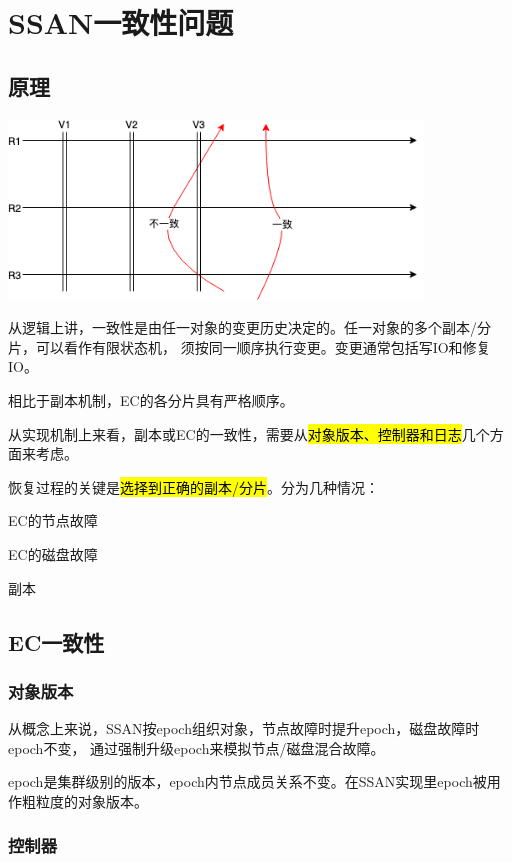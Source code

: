 \chapter{SSAN一致性问题}

\section{原理}

\includegraphics[width=11cm]{../imgs/consistency-splice.png}

从逻辑上讲，一致性是由任一对象的变更历史决定的。任一对象的多个副本/分片，可以看作有限状态机，
须按同一顺序执行变更。变更通常包括写IO和修复IO。

相比于副本机制，EC的各分片具有严格顺序。

从实现机制上来看，副本或EC的一致性，需要从\hl{对象版本、控制器和日志}几个方面来考虑。

恢复过程的关键是\hl{选择到正确的副本/分片}。分为几种情况：
\begin{enumbox}
\item EC的节点故障
\item EC的磁盘故障
\item 副本
\end{enumbox}

\section{EC一致性}

\subsection{对象版本}

从概念上来说，SSAN按epoch组织对象，节点故障时提升epoch，磁盘故障时epoch不变，
通过强制升级epoch来模拟节点/磁盘混合故障。

epoch是集群级别的版本，epoch内节点成员关系不变。在SSAN实现里epoch被用作粗粒度的对象版本。

\subsection{控制器}

